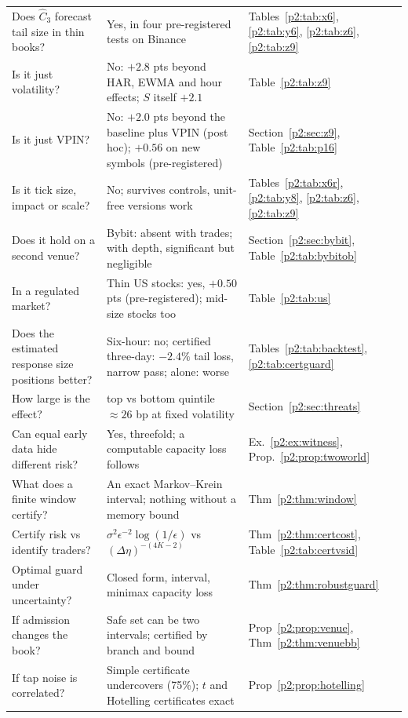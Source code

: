 {\begin{longtable}{p{}p{}p{}}
Does $\hat C_3$ forecast tail size in thin books? & Yes, in four pre-registered tests on Binance & Tables~\ref{p2:tab:x6}, \ref{p2:tab:y6}, \ref{p2:tab:z6}, \ref{p2:tab:z9}\\
Is it just volatility? & No: $+2.8$ pts beyond HAR, EWMA and hour effects; $S$ itself $+2.1$ & Table~\ref{p2:tab:z9}\\
Is it just VPIN? & No: $+2.0$ pts beyond the baseline plus VPIN (post hoc); $+0.56$ on new symbols (pre-registered) & Section~\ref{p2:sec:z9}, Table~\ref{p2:tab:p16}\\
Is it tick size, impact or scale? & No; survives controls, unit-free versions work & Tables~\ref{p2:tab:x6r}, \ref{p2:tab:y8}, \ref{p2:tab:z6}, \ref{p2:tab:z9}\\
Does it hold on a second venue? & Bybit: absent with trades; with depth, significant but negligible & Section~\ref{p2:sec:bybit}, Table~\ref{p2:tab:bybitob}\\
In a regulated market? & Thin US stocks: yes, $+0.50$ pts (pre-registered); mid-size stocks too & Table~\ref{p2:tab:us}\\
Does the estimated response size positions better? & Six-hour: no; certified three-day: $-2.4\%$ tail loss, narrow pass; alone: worse & Tables~\ref{p2:tab:backtest}, \ref{p2:tab:certguard}\\
How large is the effect? & top vs bottom quintile $\approx26$ bp at fixed volatility & Section~\ref{p2:sec:threats}\\
Can equal early data hide different risk? & Yes, threefold; a computable capacity loss follows & Ex.~\ref{p2:ex:witness}, Prop.~\ref{p2:prop:twoworld}\\
What does a finite window certify? & An exact Markov--Krein interval; nothing without a memory bound & Thm~\ref{p2:thm:window}\\
Certify risk vs identify traders? & $\sigma^2\epsilon^{-2}\log(1/\epsilon)$ vs $(\Delta\eta)^{-(4K-2)}$ & Thm~\ref{p2:thm:certcost}, Table~\ref{p2:tab:certvsid}\\
Optimal guard under uncertainty? & Closed form, interval, minimax capacity loss & Thm~\ref{p2:thm:robustguard}\\
If admission changes the book? & Safe set can be two intervals; certified by branch and bound & Prop~\ref{p2:prop:venue}, Thm~\ref{p2:thm:venuebb}\\
If tap noise is correlated? & Simple certificate undercovers (75\%); $t$ and Hotelling certificates exact & Prop~\ref{p2:prop:hotelling}\\

\end{longtable}}
